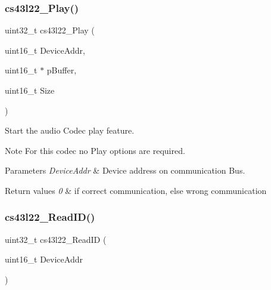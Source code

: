 \subsubsection{\texorpdfstring{cs43l22\+\_\+\+Play()}{cs43l22\_Play()}}
{\footnotesize\ttfamily uint32\+\_\+t cs43l22\+\_\+\+Play (\begin{DoxyParamCaption}\item[{uint16\+\_\+t}]{Device\+Addr,  }\item[{uint16\+\_\+t $\ast$}]{p\+Buffer,  }\item[{uint16\+\_\+t}]{Size }\end{DoxyParamCaption})}



Start the audio Codec play feature. 

\begin{DoxyNote}{Note}
For this codec no Play options are required. 
\end{DoxyNote}

\begin{DoxyParams}{Parameters}
{\em Device\+Addr} & Device address on communication Bus. ~\newline
\\
\hline
\end{DoxyParams}

\begin{DoxyRetVals}{Return values}
{\em 0} & if correct communication, else wrong communication \\
\hline
\end{DoxyRetVals}
\mbox{\label{group___c_s43_l22___exported___functions_gad4e4e8b889500f0e64c546a31d4b6dca}} 
\subsubsection{\texorpdfstring{cs43l22\+\_\+\+Read\+I\+D()}{cs43l22\_ReadID()}}
{\footnotesize\ttfamily uint32\+\_\+t cs43l22\+\_\+\+Read\+ID (\begin{DoxyParamCaption}\item[{uint16\+\_\+t}]{Device\+Addr }\end{DoxyParamCaption})}



